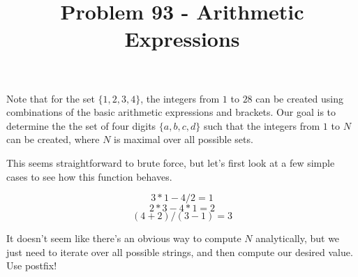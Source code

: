 \documentclass{article}
\title{Problem 93 - Arithmetic Expressions}
\begin{document}
\maketitle
Note that for the set $\{1, 2, 3, 4\}$, the integers from $1$ to $28$ can be created using combinations of the basic arithmetic expressions and brackets.  Our goal is to determine the the set of four digits $\{a, b, c, d\}$ such that the integers from $1$ to $N$ can be created, where $N$ is maximal over all possible sets.

This seems straightforward to brute force, but let's first look at a few simple cases to see how this function behaves.

\[
3*1 - 4/2  = 1
\]
\[
2*3 - 4*1 = 2
\]
\[
(4+2)/(3-1) = 3
\]

It doesn't seem like there's an obvious way to compute $N$ analytically, but we just need to iterate over all possible strings, and then compute our desired value. Use postfix!
\end{document}
